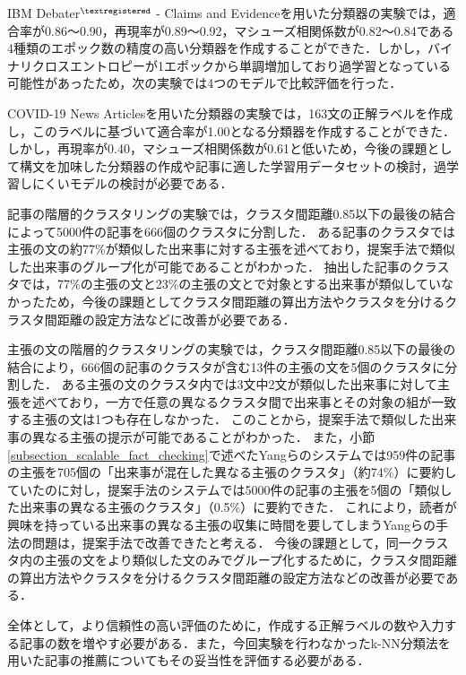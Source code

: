\documentclass[12pt,a4j]{jreport}
\begin{document}
IBM Debater$^{\textregistered}$ - Claims and Evidenceを用いた分類器の実験では，適合率が0.86～0.90，再現率が0.89～0.92，マシューズ相関係数が0.82～0.84である4種類のエポック数の精度の高い分類器を作成することができた．しかし，バイナリクロスエントロピーが1エポックから単調増加しており過学習となっている可能性があったため，次の実験では4つのモデルで比較評価を行った．

COVID-19 News Articlesを用いた分類器の実験では，163文の正解ラベルを作成し，このラベルに基づいて適合率が1.00となる分類器を作成することができた．
しかし，再現率が0.40，マシューズ相関係数が0.61と低いため，今後の課題として構文を加味した分類器の作成や記事に適した学習用データセットの検討，過学習しにくいモデルの検討が必要である．

記事の階層的クラスタリングの実験では，クラスタ間距離0.85以下の最後の結合によって5000件の記事を666個のクラスタに分割した．
ある記事のクラスタでは主張の文の約77\%が類似した出来事に対する主張を述べており，提案手法で類似した出来事のグループ化が可能であることがわかった．
抽出した記事のクラスタでは，77\%の主張の文と23\%の主張の文とで対象とする出来事が類似していなかったため，今後の課題としてクラスタ間距離の算出方法やクラスタを分けるクラスタ間距離の設定方法などに改善が必要である．

主張の文の階層的クラスタリングの実験では，クラスタ間距離0.85以下の最後の結合により，666個の記事のクラスタが含む13件の主張の文を5個のクラスタに分割した．
ある主張の文のクラスタ内では3文中2文が類似した出来事に対して主張を述べており，一方で任意の異なるクラスタ間で出来事とその対象の組が一致する主張の文は1つも存在しなかった．
このことから，提案手法で類似した出来事の異なる主張の提示が可能であることがわかった．
また，小節\ref{subsection_scalable_fact_checking}で述べたYangらのシステムでは959件の記事の主張を705個の「出来事が混在した異なる主張のクラスタ」（約74\%）に要約していたのに対し，提案手法のシステムでは5000件の記事の主張を5個の「類似した出来事の異なる主張のクラスタ」（0.5\%）に要約できた．
これにより，読者が興味を持っている出来事の異なる主張の収集に時間を要してしまうYangらの手法の問題は，提案手法で改善できたと考える．
今後の課題として，同一クラスタ内の主張の文をより類似した文のみでグループ化するために，クラスタ間距離の算出方法やクラスタを分けるクラスタ間距離の設定方法などの改善が必要である．

全体として，より信頼性の高い評価のために，作成する正解ラベルの数や入力する記事の数を増やす必要がある．また，今回実験を行わなかったk-NN分類法を用いた記事の推薦についてもその妥当性を評価する必要がある．
\end{document}
